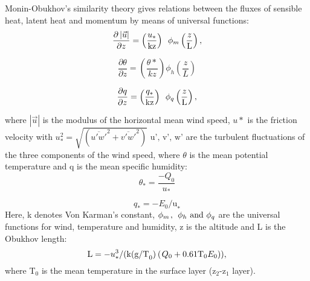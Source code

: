Monin-Obukhov's similarity theory gives relations between the fluxes of
sensible heat, latent heat and momentum by means of universal functions:
\begin{equation}
\label{eq:atmo:eq5}
\frac{\partial \left| {\vec{u}} \right|}{\partial z}=\left(
{\frac{{u}_{{\ast }} }{\mbox{kz}}} \right){\kern 1pt}{\kern
1pt}{\kern 1pt}{\kern 1pt}{\kern 1pt}\phi_{m} \left(
{\frac{z}{\mbox{L}}} \right),
\end{equation}

\begin{equation}
\label{eq:atmo:eq6}
\frac{\partial {\theta }}{\partial z}=\left( {\frac{\theta{\ast}}{kz}} \right)\phi_{h} \left({\frac{z}{L}} \right)
\end{equation}

\begin{equation}
\label{eq:atmo:eq7}
\frac{\partial q}{\partial z}=\left(
{\frac{q_{\ast} }{\mbox{kz}}} \right){\kern 1pt}{\kern
1pt}{\kern 1pt}{\kern 1pt}{\kern 1pt}\phi_{q} \left(
{\frac{z}{\mbox{L}}} \right),
\end{equation}


where $\left| {\vec{u}} \right|$ is the modulus of the horizontal mean wind speed,
\newline
$u\ast $ is the friction velocity with $u_{\ast}^{2} =\sqrt{(\overline{u'w'}^{2}+\overline{v'w'}^{2})}$
\newline
$\mbox{u',}\,\,\mbox{v',}\,\,\mbox{w'}$ are the turbulent fluctuations of the three components of the wind speed,
\newline
where $\theta$ is the mean potential temperature and q is the mean specific humidity:
\begin{equation}
\theta_{\ast}=\frac{-Q_{0}}{u_{\ast}}
\end{equation}

\begin{equation}
q_{\ast} =-E_{0} \mbox{/u}_{\ast}
\end{equation}
\newline
Here, k denotes Von Karman's constant, $\phi_{m} {\kern
1pt},\,\,{\kern 1pt}\phi_{h} \,\,\mbox{and}\,\,\phi_{q} $
are the universal functions for wind, temperature and humidity, z is the
altitude and L is the Obukhov length:
\begin{equation}
\label{eq:atmo:eq8}
\mbox{L}=-u_{\ast}^{3} \mbox{/(k(g/T}_{0}
){\kern 1pt}{\kern 1pt}\mbox{(}{\kern 1pt}Q_{0}
+\mbox{0.61T}_{0} E_{0} \mbox{))},
\end{equation}
where T$_{0}$ is the mean temperature in the surface layer (z$_{2}$-z$_{1}$
layer).

